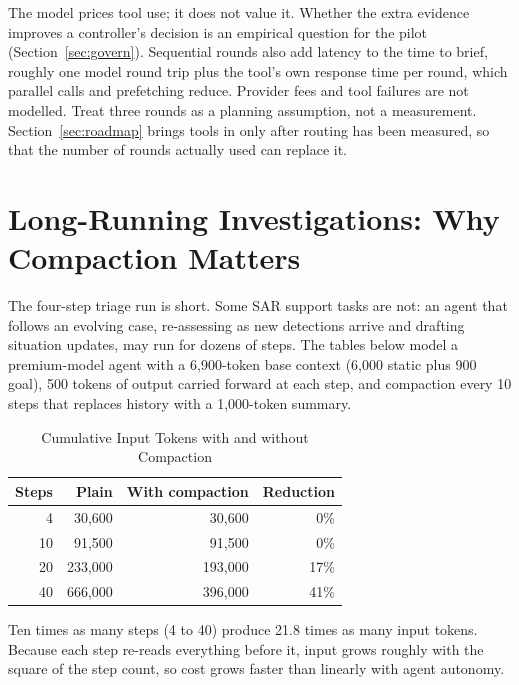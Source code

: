 \documentclass[conference]{IEEEtran}
\begin{document}
The model prices tool use; it does not value it. Whether the extra evidence improves a controller's decision is an empirical question for the pilot (Section~\ref{sec:govern}). Sequential rounds also add latency to the time to brief, roughly one model round trip plus the tool's own response time per round, which parallel calls and prefetching reduce. Provider fees and tool failures are not modelled. Treat three rounds as a planning assumption, not a measurement. Section~\ref{sec:roadmap} brings tools in only after routing has been measured, so that the number of rounds actually used can replace it.

\section{Long-Running Investigations: Why Compaction Matters}
\label{sec:long}

The four-step triage run is short. Some SAR support tasks are not: an agent that follows an evolving case, re-assessing as new detections arrive and drafting situation updates, may run for dozens of steps. The tables below model a premium-model agent with a 6,900-token base context (6,000 static plus 900 goal), 500 tokens of output carried forward at each step, and compaction every 10 steps that replaces history with a 1,000-token summary.

\begin{table}[!t]
\caption{Cumulative Input Tokens with and without Compaction}
\label{tab:tokens}
\centering
\footnotesize
\begin{tabular}{@{}r r r r@{}}
\toprule
\textbf{Steps} & \textbf{Plain} & \textbf{With compaction} & \textbf{Reduction} \\
\midrule
4 & 30,600 & 30,600 & 0\% \\
10 & 91,500 & 91,500 & 0\% \\
20 & 233,000 & 193,000 & 17\% \\
40 & 666,000 & 396,000 & 41\% \\
\bottomrule
\end{tabular}
\end{table}

Ten times as many steps (4 to 40) produce 21.8 times as many input tokens. Because each step re-reads everything before it, input grows roughly with the square of the step count, so cost grows faster than linearly with agent autonomy.
\end{document}
